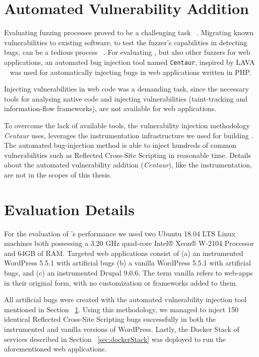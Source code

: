 \section{Automated Vulnerability Addition}\label{sec:automated}
Evaluating fuzzing processes proved to be a challenging task ~\cite{klees2018Evaluation}. Migrating known vulnerabilities to existing software, to test the fuzzer's capabilities in detecting bugs, can be a tedious process ~\cite{bug-reproduction}. For evaluating \pname{}, but also other fuzzers for web applications, an automated bug injection tool named {\tt Centaur}, inspired by LAVA ~\cite{dolan2016lava} was used for automatically injecting bugs in web applications written in PHP. 

Injecting vulnerabilities in web code was a demanding task, since the necessary tools for analysing native code and injecting vulnerabilities (\eg taint-tracking and information-flow frameworks), are not available for web applications. 

To overcome the lack of available tools, the vulnerability injection methodology \textit{Centaur} uses, leverages the instrumentation infrastructure we used for building \pname{}. The automated bug-injection method is able to inject hundreds of common vulnerabilities such as Reflected Cross-Site Scripting in reasonable time. Details about the automated vulnerability addition (\textit{Centaur}), like the instrumentation, are not in the scopes of this thesis.

\section{Evaluation Details}
For the evaluation of \pname{}'s performance we used two Ubuntu 18.04 LTS Linux machines both possessing a 3.20 GHz quad-core Intel® Xeon® W-2104 Processor and 64GB of RAM. Targeted web applications consist of (a) an instrumented WordPress 5.5.1 with artificial bugs (b) a vanilla  WordPress 5.5.1 with artificial bugs, and (c) an instrumented Drupal 9.0.6. The term vanilla refers to web-apps in their original form, with no customization or frameworks added to them. 

All artificial bugs were created with the automated vulnerability injection tool mentioned in  Section ~\ref{sec:automated}. Using this methodology, we managed to inject 150 identical Reflected Cross-Site Scripting bugs successfully in both the instrumented and vanilla versions of WordPress. Lastly, the Docker Stack of services described in Section ~\ref{sec:dockerStack} was deployed to run the aforementioned web applications.

